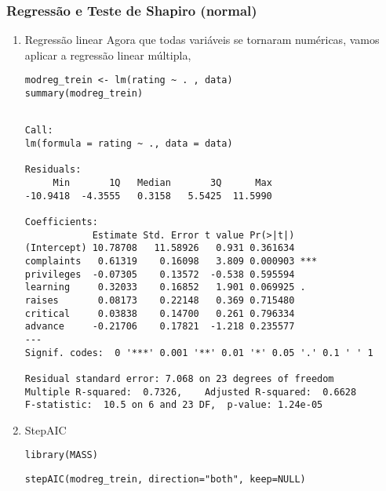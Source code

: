 \documentclass[11pt]{article}
\begin{document}
\subsubsection{Regressão e Teste de Shapiro (normal)}
\label{sec:orgad6affe}
\begin{enumerate}
\item Regressão linear
\label{sec:org423be55}
Agora que todas variáveis se tornaram numéricas, vamos aplicar a regressão linear múltipla,

\begin{verbatim}
modreg_trein <- lm(rating ~ . , data)
summary(modreg_trein)
\end{verbatim}

\begin{verbatim}

Call:
lm(formula = rating ~ ., data = data)

Residuals:
     Min       1Q   Median       3Q      Max 
-10.9418  -4.3555   0.3158   5.5425  11.5990 

Coefficients:
            Estimate Std. Error t value Pr(>|t|)    
(Intercept) 10.78708   11.58926   0.931 0.361634    
complaints   0.61319    0.16098   3.809 0.000903 ***
privileges  -0.07305    0.13572  -0.538 0.595594    
learning     0.32033    0.16852   1.901 0.069925 .  
raises       0.08173    0.22148   0.369 0.715480    
critical     0.03838    0.14700   0.261 0.796334    
advance     -0.21706    0.17821  -1.218 0.235577    
---
Signif. codes:  0 '***' 0.001 '**' 0.01 '*' 0.05 '.' 0.1 ' ' 1

Residual standard error: 7.068 on 23 degrees of freedom
Multiple R-squared:  0.7326,	Adjusted R-squared:  0.6628 
F-statistic:  10.5 on 6 and 23 DF,  p-value: 1.24e-05

\end{verbatim}

\item StepAIC
\label{sec:orgaeb2516}
\begin{verbatim}
library(MASS)
\end{verbatim}

\begin{verbatim}
stepAIC(modreg_trein, direction="both", keep=NULL)
\end{verbatim}


\end{enumerate}
\end{document}
